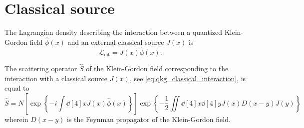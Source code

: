 \section{Classical source}

\begin{definition}
	The Lagrangian density describing the interaction between a quantized Klein-Gordon field $\hat\phi(x)$ and an external classical source $J(x)$ is
	\begin{equation}
		\mathcal{L}_\text{int}
		=
		J(x)
		\hat\phi(x)
		\label{eq:qkg_classical_interaction}
		.
	\end{equation}
\end{definition}
\begin{theorem}
	The scattering operator $\hat{S}$ of the Klein-Gordon field corresponding to the interaction with a classical source $J(x)$, see \cref{eq:qkg_classical_interaction}, is equal to
	\begin{equation}
		\hat{S}
		=
		N\left[
			\exp\left\{
				-i
				\int\dd[4]{x}
				J(x)
				\hat\phi(x)
			\right\}
		\right]
		\exp\left\{
			-
			\frac{1}{2}
			\iint\dd[4]{x}\dd[4]{y}
			J(x)
			D(x-y)
			J(y)
		\right\}
		\label{eq:scattering_operator_classical_interaction}
	\end{equation}
	wherein $D(x-y)$ is the Feynman propagator of the Klein-Gordon field.
\end{theorem}
